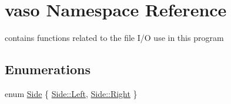 \hypertarget{namespacevaso}{\section{vaso Namespace Reference}
\label{namespacevaso}
}


contains functions related to the file I/\+O use in this program  


\subsection*{Enumerations}
\begin{DoxyCompactItemize}
\item 
enum \hyperlink{namespacevaso_a77c5d9704657d49d456f691ddd8abf7c}{Side} \{ \hyperlink{namespacevaso_a77c5d9704657d49d456f691ddd8abf7ca945d5e233cf7d6240f6b783b36a374ff}{Side\+::\+Left}, 
\hyperlink{namespacevaso_a77c5d9704657d49d456f691ddd8abf7ca92b09c7c48c520c3c55e497875da437c}{Side\+::\+Right}
 \}
\end{DoxyCompactItemize}
